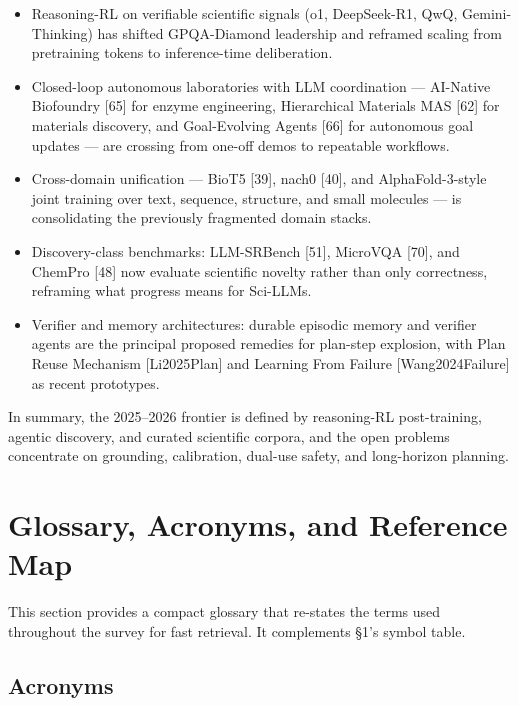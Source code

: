 \begin{itemize}
\tightlist
\item
  Reasoning-RL on verifiable scientific signals (o1, DeepSeek-R1, QwQ, Gemini-Thinking) has shifted GPQA-Diamond leadership and reframed scaling from pretraining tokens to inference-time deliberation.
\item
  Closed-loop autonomous laboratories with LLM coordination --- AI-Native Biofoundry {[}65{]} for enzyme engineering, Hierarchical Materials MAS {[}62{]} for materials discovery, and Goal-Evolving Agents {[}66{]} for autonomous goal updates --- are crossing from one-off demos to repeatable workflows.
\item
  Cross-domain unification --- BioT5 {[}39{]}, nach0 {[}40{]}, and AlphaFold-3-style joint training over text, sequence, structure, and small molecules --- is consolidating the previously fragmented domain stacks.
\item
  Discovery-class benchmarks: LLM-SRBench {[}51{]}, MicroVQA {[}70{]}, and ChemPro {[}48{]} now evaluate scientific novelty rather than only correctness, reframing what progress means for Sci-LLMs.
\item
  Verifier and memory architectures: durable episodic memory and verifier agents are the principal proposed remedies for plan-step explosion, with Plan Reuse Mechanism {[}Li2025Plan{]} and Learning From Failure {[}Wang2024Failure{]} as recent prototypes.
\end{itemize}

In summary, the 2025--2026 frontier is defined by reasoning-RL post-training, agentic discovery, and curated scientific corpora, and the open problems concentrate on grounding, calibration, dual-use safety, and long-horizon planning.

\section{Glossary, Acronyms, and Reference Map}\label{glossary-acronyms-and-reference-map}

This section provides a compact glossary that re-states the terms used throughout the survey for fast retrieval. It complements §1's symbol table.

\subsection{Acronyms}\label{acronyms}

